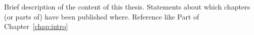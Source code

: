 Brief description of the content of this thesis. Statements about which chapters (or parts of) have been published where. Reference like Part of Chapter~\ref{chap:intro} 
